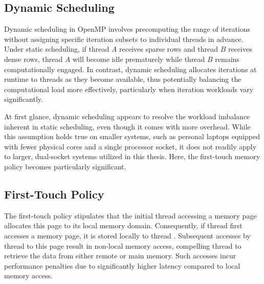 

\subsection{Dynamic Scheduling}

Dynamic scheduling in OpenMP involves precomputing the range of iterations without assigning specific iteration subsets to individual threads in advance. Under static scheduling, if thread \(A\) receives sparse rows and thread \(B\) receives dense rows, thread \(A\) will become idle prematurely while thread \(B\) remains computationally engaged. In contrast, dynamic scheduling allocates iterations at runtime to threads as they become available, thus potentially balancing the computational load more effectively, particularly when iteration workloads vary significantly.

At first glance, dynamic scheduling appears to resolve the workload imbalance inherent in static scheduling, even though it comes with more overhead. While this assumption holds true on smaller systems, such as personal laptops equipped with fewer physical cores and a single processor socket, it does not readily apply to larger, dual-socket systems utilized in this thesis. Here, the first-touch memory policy becomes particularly significant.

\subsection{First-Touch Policy}
The first-touch policy stipulates that the initial thread accessing a memory page allocates this page to its local memory domain. Consequently, if thread  first accesses a memory page, it is stored locally to thread . Subsequent accesses by thread  to this page result in non-local memory access, compelling thread  to retrieve the data from either remote or main memory. Such accesses incur performance penalties due to significantly higher latency compared to local memory access.

